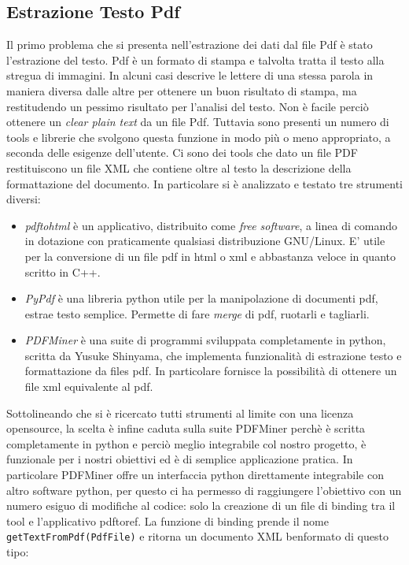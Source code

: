 \subsection{Estrazione Testo Pdf}
Il primo problema che si presenta nell'estrazione dei dati dal file Pdf è stato l'estrazione del testo. Pdf è un formato di stampa e talvolta tratta il testo alla stregua di immagini. In alcuni casi descrive le lettere di una stessa parola in maniera diversa dalle altre per ottenere un buon risultato di stampa, ma restitudendo un pessimo risultato per l'analisi del testo. Non è facile perciò ottenere un \textit{clear plain text} da un file Pdf. Tuttavia sono presenti un numero di tools e librerie che svolgono questa funzione in modo più o meno appropriato, a seconda delle esigenze dell'utente. Ci sono dei tools che dato un file PDF restituiscono un file XML che contiene oltre al testo la descrizione della formattazione del documento. 
In particolare si è analizzato e testato tre strumenti diversi:
\begin{itemize}
 \item \textit{pdftohtml} è un applicativo, distribuito come \textit{free software}, a linea di comando in dotazione con praticamente qualsiasi distribuzione GNU/Linux. E' utile per la conversione di un file pdf in html o xml e abbastanza veloce in quanto scritto in C++.
 \item \textit{PyPdf} è una libreria python utile per la manipolazione di documenti pdf, estrae testo semplice. Permette di fare \textit{merge} di pdf, ruotarli e tagliarli.
 \item \textit{PDFMiner} è una suite di programmi sviluppata completamente in python, scritta da Yusuke Shinyama, che implementa funzionalità di estrazione testo e formattazione da files pdf. In particolare fornisce la possibilità di ottenere un file xml equivalente al pdf.
\end{itemize}

Sottolineando che si è ricercato tutti strumenti al limite con una licenza opensource, la scelta è infine caduta sulla suite PDFMiner perchè è scritta completamente in python e perciò meglio integrabile col nostro progetto, è funzionale per i nostri obiettivi ed è di semplice applicazione pratica.
In particolare PDFMiner offre un interfaccia python direttamente integrabile con altro software python, per questo ci ha permesso di raggiungere l'obiettivo con un numero esiguo di modifiche al codice: solo la creazione di un file di binding tra il tool e l'applicativo pdftoref. La funzione di binding prende il nome \texttt{getTextFromPdf(PdfFile)} e ritorna un documento XML benformato di questo tipo:

